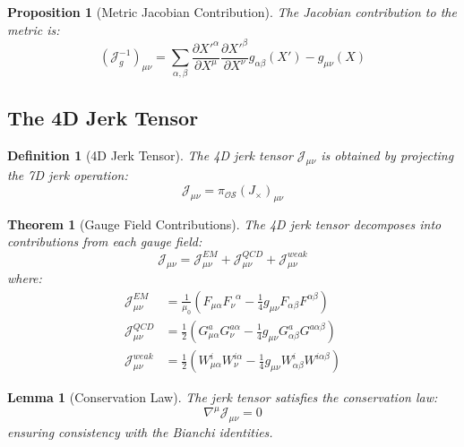 \documentclass{article}
\newtheorem{theorem}{Theorem}
\newtheorem{proposition}{Proposition}
\newtheorem{lemma}{Lemma}
\newtheorem{definition}{Definition}
\begin{document}
\begin{proposition}[Metric Jacobian Contribution]
The Jacobian contribution to the metric is:
\begin{equation}
(\mathcal{J}^{-1}_g)_{\mu\nu} = \sum_{\alpha,\beta} \frac{\partial X'^{\alpha}}{\partial X^{\mu}} \frac{\partial X'^{\beta}}{\partial X^{\nu}} g_{\alpha\beta}(X') - g_{\mu\nu}(X)
\end{equation}
\end{proposition}

\subsection{The 4D Jerk Tensor}

\begin{definition}[4D Jerk Tensor]
The 4D jerk tensor $\mathcal{J}_{\mu\nu}$ is obtained by projecting the 7D jerk operation:
\begin{equation}
\mathcal{J}_{\mu\nu} = \pi_{\mathcal{OS}}(J_{\times})_{\mu\nu}
\end{equation}
\end{definition}

\begin{theorem}[Gauge Field Contributions]
The 4D jerk tensor decomposes into contributions from each gauge field:
\begin{equation}
\mathcal{J}_{\mu\nu} = \mathcal{J}^{EM}_{\mu\nu} + \mathcal{J}^{QCD}_{\mu\nu} + \mathcal{J}^{weak}_{\mu\nu}
\end{equation}
where:
\begin{align}
\mathcal{J}^{EM}_{\mu\nu} &= \frac{1}{\mu_0}\left(F_{\mu\alpha}F_{\nu}^{\;\;\alpha} - \frac{1}{4}g_{\mu\nu}F_{\alpha\beta}F^{\alpha\beta}\right) \\
\mathcal{J}^{QCD}_{\mu\nu} &= \frac{1}{2}\left(G^a_{\mu\alpha}G^{a\alpha}_{\nu} - \frac{1}{4}g_{\mu\nu}G^a_{\alpha\beta}G^{a\alpha\beta}\right) \\
\mathcal{J}^{weak}_{\mu\nu} &= \frac{1}{2}\left(W^i_{\mu\alpha}W^{i\alpha}_{\nu} - \frac{1}{4}g_{\mu\nu}W^i_{\alpha\beta}W^{i\alpha\beta}\right)
\end{align}
\end{theorem}

\begin{lemma}[Conservation Law]
The jerk tensor satisfies the conservation law:
\begin{equation}
\nabla^{\mu} \mathcal{J}_{\mu\nu} = 0
\end{equation}
ensuring consistency with the Bianchi identities.
\end{lemma}
\end{document}
